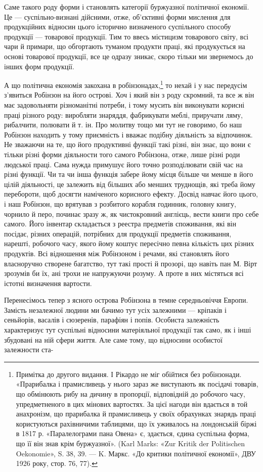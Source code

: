 Саме такого роду форми і становлять категорії буржуазної
політичної економії. Це — суспільно-визнані дійсними, отже,
об’єктивні форми мислення для продукційних відносин цього
історично визначеного суспільного способу продукції — товарової
продукції. Тим то ввесь містицизм товарового світу, всі чари й
примари, що обгортають туманом продукти праці, які продукується
на основі товарової продукції, все це одразу зникає, скоро
тільки ми звернемось до інших форм продукції.

А що політична економія закохана в робінзонадах,\footnote{
Примітка до другого видання. І Рікардо не міг обійтися без робінзонади.
«Прарибалка і прамисливець у нього зараз же виступають
як посідачі товарів, що обмінюють рибу на дичину в пропорції, відповідній
до робочого часу, упредметненого в цих мінових вартостях. За цієї
нагоди він вдається в той анахронізм, що прарибалка й прамисливець
у своїх обрахунках знарядь праці користуються рахівничими таблицями,
що їх уживалось на лондонській біржі в 1817 р. «Паралелограми пана
Овена» є, здається, єдина суспільна форма, що її він знав крім буржуазної».
(Karl Marks: «Zur Kritik der Politischen Oekonomie», S. 38, 39. —
K. Маркс. «До критики політичної економії», ДВУ 1926 року,
стор. 76, 77).
} то нехай
і у нас передусім з’явиться Робінзон на його острові. Хоч і який
він з роду скромний, та все ж він має задовольняти різноманітні
потреби, і тому мусить він виконувати корисні праці різного
роду: виробляти знаряддя, фабрикувати меблі, приручати ляму,
рибалчити, полювати й т. ін. Про молитву тощо ми тут не говоримо,
бо наш Робінзон находить у тому приємність і вважає подібну
діяльність за відпочинок. Не зважаючи на те, що його продуктивні
функції такі різні, він знає, що вони є тільки різні форми
діяльности того самого Робінзона, отже, лише різні роди людської
праці. Сама нужда примушує його точно розподілювати свій час
на різні функції. Чи та чи інша функція забере йому місця більше
чи менше в його цілій діяльності, це залежить від більших або
менших труднощів, які треба йому перебороти, щоб досягти наміченого
корисного ефекту. Досвід навчає його цього, і наш Робінзон,
що врятував з розбитого корабля годинник, головну книгу,
чорнило й перо, починає зразу ж, як чистокровний англієць, вести
книги про себе самого. Його інвентар складається з реестра предметів
споживання, які він посідає, різних операцій, потрібних для
продукції предметів споживання, нарешті, робочого часу, якого
йому коштує пересічно певна кількість цих різних продуктів. Всі
відношення між Робінзоном і речами, які становлять його власноручно
створене багатство, тут такі прості й прозорі, що навіть
пан М. Вірт зрозумів би їх, ані трохи не напружуючи розуму.
А проте в них містяться всі істотні визначення вартости.

Перенесімось тепер з ясного острова Робінзона в темне середньовіччя
Европи. Замість незалежної людини ми бачимо тут усіх
залежними — кріпаків і сеньйорів, васалів і сюзеренів, парафіян
і попів. Особиста залежність характеризує тут суспільні відносини
матеріяльної продукції так само, як і інші збудовані на ній сфери
життя. Але саме тому, що відносини особистої залежности ста-